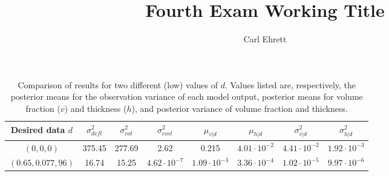 \documentclass{article}
\author{Carl Ehrett}
\title{Fourth Exam Working Title}
\begin{document}
\maketitle

\begin{table}[h]
\centering
\begin{tabular}{| c | c  | c  |  c | c  | c | c | c |}
\hline
Desired data $d$ & $\sigma^2_{defl}$ & $\sigma^2_{rot}$ & $\sigma^2_{cost}$ & $\mu_{v|d}$ &
                            $\mu_{h|d}$ & $\sigma^2_{v|d}$ & $\sigma^2_{h|d}$\\
\hline
$(0, 0, 0)$ & 375.45 & 277.69 & 2.62 & 0.215 & $4.01 \cdot 10^{-2}$&
	$4.41\cdot 10^{-2}$ & $1.92 \cdot 10^{-3}$\\
$(0.65, 0.077, 96)$ & 16.74 & 15.25 & $4.62 \cdot 10^{-7}$ &
	$1.09 \cdot 10^{-3}$ & $3.36 \cdot10^{-4}$ &
	$1.02 \cdot 10^{-5}$ & $9.97 \cdot 10^{-6}$\\
\hline
\end{tabular}
\caption{Comparison of results for two different (low) values of $d$. Values listed are, respectively, the posterior means for the observation variance of each model output, posterior means for volume fraction ($v$) and thickness ($h$), and posterior variance of volume fraction and thickness.}
\end{table}





%
\end{document}
